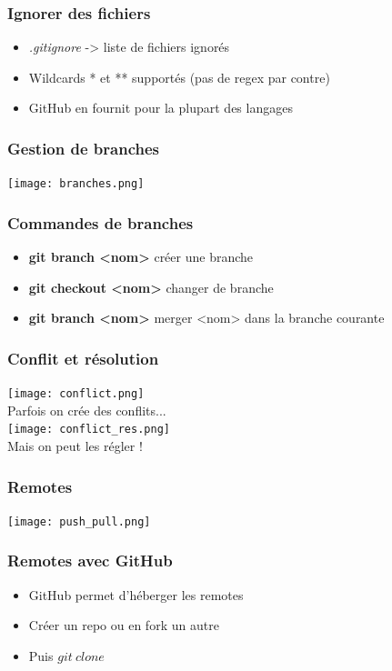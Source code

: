 \documentclass[aspectratio=169]{beamer}
\begin{document}
\begin{frame}
  \frametitle{Ignorer des fichiers}
  \begin{itemize}
    \item \textit{.gitignore} -> liste de fichiers ignorés
    \item Wildcards * et ** supportés (pas de regex par contre)
    \item GitHub en fournit pour la plupart des langages
  \end{itemize}
\end{frame}

\begin{frame}
  \frametitle{Gestion de branches}
  \begin{center}
    \texttt{[image: branches.png]}
  \end{center}
\end{frame}

\begin{frame}
  \frametitle{Commandes de branches}
  \begin{itemize}
    \item \textbf{git branch <nom>} créer une branche
    \item \textbf{git checkout <nom>} changer de branche
    \item \textbf{git branch <nom>} merger <nom> dans la branche courante
  \end{itemize}
\end{frame}

\begin{frame}
  \frametitle{Conflit et résolution}
  \begin{center}
    \texttt{[image: conflict.png]}\\
    Parfois on crée des conflits...\\\bigskip
    \texttt{[image: conflict\_res.png]}\\
    Mais on peut les régler !
  \end{center}
\end{frame}

\begin{frame}
  \frametitle{Remotes}
  \begin{center}
    \texttt{[image: push\_pull.png]}
  \end{center}
\end{frame}

\begin{frame}
  \frametitle{Remotes avec GitHub}
  \begin{itemize}
  \item GitHub permet d'héberger les remotes
  \item Créer un repo ou en fork un autre
  \item Puis $git\:clone$
  \end{itemize}
\end{frame}
\end{document}
